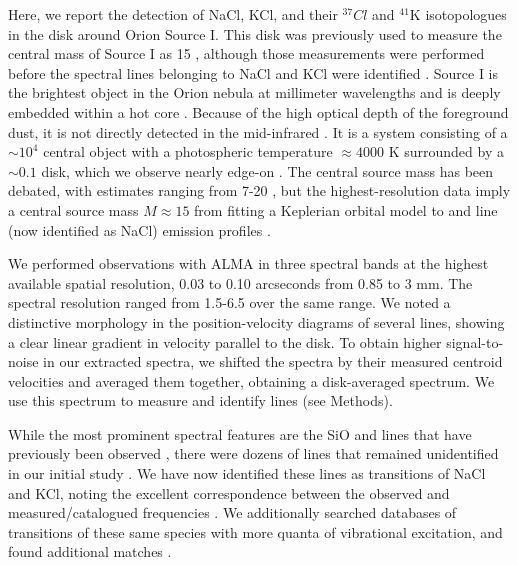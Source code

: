 \documentclass[12pt]{article}
\begin{document}
Here, we report the detection of NaCl, KCl, and their $^{37}Cl$ and $^{41}$K
isotopologues in the disk around Orion Source I.  This disk was previously used
to measure the central mass of Source I as 15 \msun, although those
measurements were performed before the spectral lines belonging to NaCl and KCl
were identified \citep{Ginsburg2018b}.  Source I is the brightest object in the
Orion nebula at millimeter wavelengths and is deeply embedded within a hot core
\citep{}. Because of the high optical depth of the foreground dust, it is not
directly detected in the
mid-infrared \citep[e.g.,][]{Robberto2005a}. It is a system consisting of a
$\sim10^4$ \lsun central object with a photospheric temperature $\approx4000$ K
\citep{Testi2010a} surrounded by a $\sim0.1$ \msun disk, which we observe
nearly edge-on \citep{Plambeck2016a}.  The central source mass has been
debated, with estimates ranging from 7-20 \msun \citep{Matthews2010a,other},
but the highest-resolution data imply a central source mass $M\approx15$ \msun
from fitting a Keplerian orbital model to \water and line (now identified as
NaCl) emission profiles \citep{Ginsburg2018b}.

We performed observations with ALMA in three spectral bands at the highest
available spatial resolution, 0.03 to 0.10 arcseconds from 0.85 to 3 mm. The
spectral resolution ranged from 1.5-6.5 \kms over the same range.  We noted a
distinctive morphology in the position-velocity diagrams of several lines,
showing a clear linear gradient in velocity parallel to the disk. To obtain
higher signal-to-noise in our extracted spectra, we shifted the spectra by
their measured centroid velocities and averaged them together, obtaining a
disk-averaged spectrum.  We use this spectrum to measure and  identify lines
(see Methods).

While the most prominent spectral features are the SiO and \water lines that
have previously been observed \citep{Goddi2013a,Hirota2014a}, there were dozens
of lines that remained unidentified in our initial study \citep{Ginsburg2018b}.
We have now identified these lines as transitions of NaCl and KCl, noting the
excellent correspondence between the observed and measured/catalogued
frequencies \citep{Caris2002a,Caris2004a,Muller2005a,Lovas2005a,Pickett1998a}.
We additionally searched databases of transitions of these same species with
more quanta of vibrational excitation, and found additional matches
\citep{Barton2014a,Cabezas2016a}.
\end{document}
